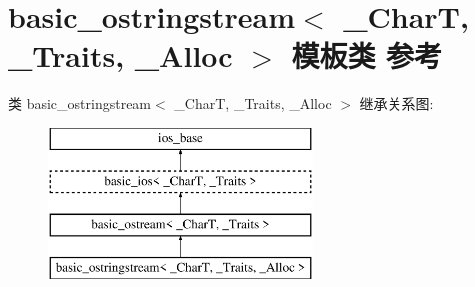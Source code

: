 \hypertarget{classbasic__ostringstream}{}\section{basic\+\_\+ostringstream$<$ \+\_\+\+CharT, \+\_\+\+Traits, \+\_\+\+Alloc $>$ 模板类 参考}
\label{classbasic__ostringstream}
类 basic\+\_\+ostringstream$<$ \+\_\+\+CharT, \+\_\+\+Traits, \+\_\+\+Alloc $>$ 继承关系图\+:\begin{figure}[H]
\begin{center}
\leavevmode
\includegraphics[height=4.000000cm]{classbasic__ostringstream}
\end{center}
\end{figure}
